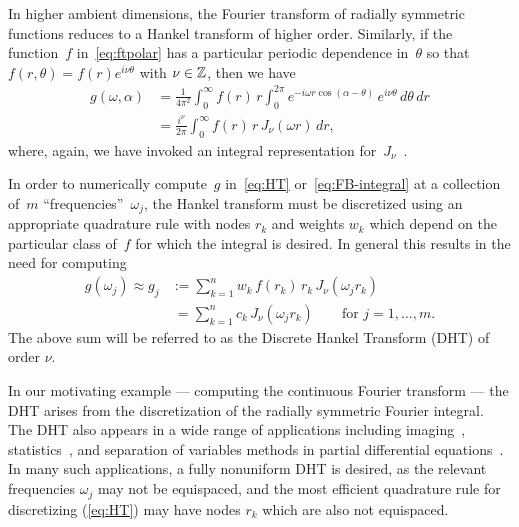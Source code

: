 In higher ambient dimensions, the Fourier transform of radially symmetric
functions reduces to a Hankel transform of higher order. Similarly, if the
function~$f$ in~\eqref{eq:ftpolar} has a particular periodic dependence
in~$\theta$ so that $f(r,\theta) = f(r)e^{i\nu\theta}$ with $\nu \in \mathbb{Z}$, then
we have
\begin{equation} \label{eq:FB-integral}
  \begin{aligned}
  g(\omega,\alpha) &= \frac{1}{4\pi^2} \int_0^\infty f(r) \, r \int_0^{2\pi} 
  e^{-i \omega r \cos(\alpha - \theta) } \, e^{i\nu\theta}  \, d\theta \, dr \\
  &= \frac{i^\nu}{2\pi} \int_0^\infty f(r) \, r \, J_\nu(\omega r)  \, dr,
  \end{aligned}
\end{equation}
where, again, we have invoked an integral representation
for~$J_\nu$~\cite{olver2010nist}. 

In order to numerically compute~$g$ in~\eqref{eq:HT} or~\eqref{eq:FB-integral}
at a collection of~$m$ ``frequencies''~$\omega_j$, the Hankel transform must be
discretized using an appropriate quadrature rule with nodes $r_k$ and weights
$w_k$ which depend on the particular class of~$f$ for which the integral is
desired. In general this results in the need for computing
\begin{equation} \label{eq:DHT}
  \begin{aligned}
  g(\omega_j) \approx 
  g_j &:= \sum_{k=1}^n w_k \, f(r_k) \, r_k \, J_\nu(\omega_j r_k) \\
  &\ = \sum_{k=1}^n c_k \, J_\nu(\omega_j r_k)
   \qquad \text{for } j = 1, \ldots, m.
  \end{aligned}
\end{equation}
The above sum will be referred to as the Discrete Hankel Transform (DHT) of
order $\nu$. 

In our motivating example --- computing the continuous Fourier transform --- the
DHT arises from the discretization of the radially symmetric Fourier integral.
The DHT also appears in a wide range of applications including
imaging~\cite{higgins1988hankel, zhao2013fourier, marshall2023fast},
statistics~\cite{lord1954a, genton2002nonparametric}, and separation of
variables methods in partial differential
equations~\cite{bisseling1985fast,ali1999generalized, zhou2022spectral}. In many
such applications, a fully nonuniform DHT is desired, as the relevant
frequencies $\omega_j$ may not be equispaced, and the most efficient quadrature
rule for discretizing (\ref{eq:HT}) may have nodes $r_k$ which are also not
equispaced. 

